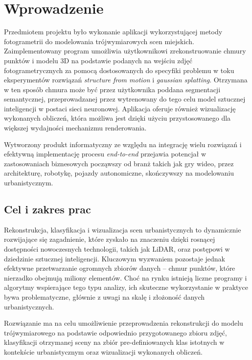 \section{Wprowadzenie}

Przedmiotem projektu było wykonanie aplikacji wykorzystującej metody fotogrametrii do modelowania trójwymiarowych scen miejskich. Zaimplementowany program umożliwia użytkownikowi zrekonstruowanie chmury punktów i modelu 3D na podstawie podanych na wejściu zdjęć fotogrametrycznych za pomocą dostosowanych do specyfiki problemu w toku eksperymentów rozwiązań \textit{structure from motion} i \textit{gaussian splatting}. Otrzymana w ten sposób chmura może być przez użytkownika poddana segmentacji semantycznej, przeprowadzanej przez wytrenowany do tego celu model sztucznej inteligencji w postaci sieci neuronowej. Aplikacja oferuje również wizualizację wykonanych obliczeń, która możliwa jest dzięki użyciu przystosowanego dla większej wydajności mechanizmu renderowania.

Wytworzony produkt informatyczny ze względu na integrację wielu rozwiązań i efektywną implementację procesu \textit{end-to-end} przejawia potencjał w zastosowaniach biznesowych począwszy od branż takich jak gry wideo, przez architekturę, robotykę, pojazdy autonomiczne, skończywszy na modelowaniu urbanistycznym.

\subsection{Cel i zakres prac}

Rekonstrukcja, klasyfikacja i wizualizacja scen urbanistycznych to dynamicznie rozwijające się zagadnienie, które zyskało na znaczeniu dzięki rosnącej dostępności nowoczesnych technologii, takich jak LiDAR, oraz postępowi w dziedzinie sztucznej inteligencji. Kluczowym wyzwaniem pozostaje jednak efektywne przetwarzanie ogromnych zbiorów danych – chmur punktów, które nierzadko obejmują miliony elementów. Choć na rynku istnieją liczne programy i algorytmy wspierające tego typu analizy, ich skuteczne wykorzystanie w praktyce bywa problematyczne, głównie z uwagi na skalę i złożoność danych urbanistycznych.

Rozwiązanie ma na celu umożliwienie przeprowadzenia rekonstrukcji do modelu trójwymiarowego na podstawie odpowiednio przygotowanego zbioru zdjęć, klasyfikacji otrzymanej sceny na zbiór pre-definiowanych klas istotnych w kontekście urbanistycznym oraz wizualizacji wykonanych obliczeń. 

